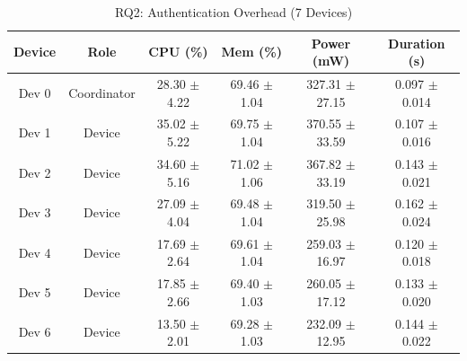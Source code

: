 \begin{table}[htbp]
\centering
\caption{RQ2: Authentication Overhead (7 Devices)}
\label{tab:RQ2-Device-Overhead-7Nodes-Auth-table}
\begin{tabular}{|c|c|c|c|c|c|}
\hline
\textbf{Device} & \textbf{Role} & \textbf{CPU (\%)} & \textbf{Mem (\%)} & \textbf{Power (mW)} & \textbf{Duration (s)} \\
\hline
Dev 0 & Coordinator & 28.30 $\pm$ 4.22 & 69.46 $\pm$ 1.04 & 327.31 $\pm$ 27.15 & 0.097 $\pm$ 0.014 \\
\hline
Dev 1 & Device & 35.02 $\pm$ 5.22 & 69.75 $\pm$ 1.04 & 370.55 $\pm$ 33.59 & 0.107 $\pm$ 0.016 \\
\hline
Dev 2 & Device & 34.60 $\pm$ 5.16 & 71.02 $\pm$ 1.06 & 367.82 $\pm$ 33.19 & 0.143 $\pm$ 0.021 \\
\hline
Dev 3 & Device & 27.09 $\pm$ 4.04 & 69.48 $\pm$ 1.04 & 319.50 $\pm$ 25.98 & 0.162 $\pm$ 0.024 \\
\hline
Dev 4 & Device & 17.69 $\pm$ 2.64 & 69.61 $\pm$ 1.04 & 259.03 $\pm$ 16.97 & 0.120 $\pm$ 0.018 \\
\hline
Dev 5 & Device & 17.85 $\pm$ 2.66 & 69.40 $\pm$ 1.03 & 260.05 $\pm$ 17.12 & 0.133 $\pm$ 0.020 \\
\hline
Dev 6 & Device & 13.50 $\pm$ 2.01 & 69.28 $\pm$ 1.03 & 232.09 $\pm$ 12.95 & 0.144 $\pm$ 0.022 \\
\hline
\end{tabular}
\end{table}

